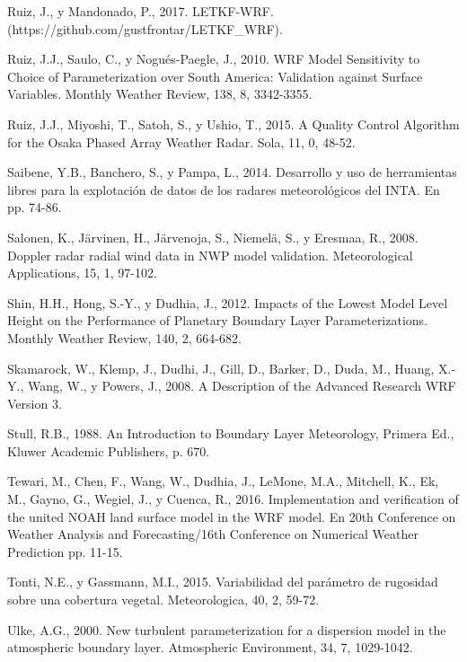 \documentclass[12pt,spanish,oneside, a4paper]{book}
\begin{document}
\hypertarget{ref-Ruiz2017}{}
Ruiz, J., y Mandonado, P., 2017. LETKF-WRF.
(https://github.com/gustfrontar/LETKF\_WRF).

\hypertarget{ref-Ruiz2010}{}
Ruiz, J.J., Saulo, C., y Nogués-Paegle, J., 2010. WRF Model Sensitivity
to Choice of Parameterization over South America: Validation against
Surface Variables. Monthly Weather Review, 138, 8, 3342-3355.

\hypertarget{ref-Ruiz2015}{}
Ruiz, J.J., Miyoshi, T., Satoh, S., y Ushio, T., 2015. A Quality Control
Algorithm for the Osaka Phased Array Weather Radar. Sola, 11, 0, 48-52.

\hypertarget{ref-Saibene2014}{}
Saibene, Y.B., Banchero, S., y Pampa, L., 2014. Desarrollo y uso de
herramientas libres para la explotación de datos de los radares
meteorológicos del INTA. En pp. 74-86.

\hypertarget{ref-Salonen2008}{}
Salonen, K., Järvinen, H., Järvenoja, S., Niemelä, S., y Eresmaa, R.,
2008. Doppler radar radial wind data in NWP model validation.
Meteorological Applications, 15, 1, 97-102.

\hypertarget{ref-Shin2012}{}
Shin, H.H., Hong, S.-Y., y Dudhia, J., 2012. Impacts of the Lowest Model
Level Height on the Performance of Planetary Boundary Layer
Parameterizations. Monthly Weather Review, 140, 2, 664-682.

\hypertarget{ref-Skamarock2008}{}
Skamarock, W., Klemp, J., Dudhi, J., Gill, D., Barker, D., Duda, M.,
Huang, X.-Y., Wang, W., y Powers, J., 2008. A Description of the
Advanced Research WRF Version 3.

\hypertarget{ref-Stull1988}{}
Stull, R.B., 1988. An Introduction to Boundary Layer Meteorology,
Primera Ed., Kluwer Academic Publishers, p. 670.

\hypertarget{ref-Tewari2004}{}
Tewari, M., Chen, F., Wang, W., Dudhia, J., LeMone, M.A., Mitchell, K.,
Ek, M., Gayno, G., Wegiel, J., y Cuenca, R., 2016. Implementation and
verification of the united NOAH land surface model in the WRF model. En
20th Conference on Weather Analysis and Forecasting/16th Conference on
Numerical Weather Prediction pp. 11-15.

\hypertarget{ref-Tonti2015}{}
Tonti, N.E., y Gassmann, M.I., 2015. Variabilidad del parámetro de
rugosidad sobre una cobertura vegetal. Meteorologica, 40, 2, 59-72.

\hypertarget{ref-Ulke2000}{}
Ulke, A.G., 2000. New turbulent parameterization for a dispersion model
in the atmospheric boundary layer. Atmospheric Environment, 34, 7,
1029-1042.
\end{document}

